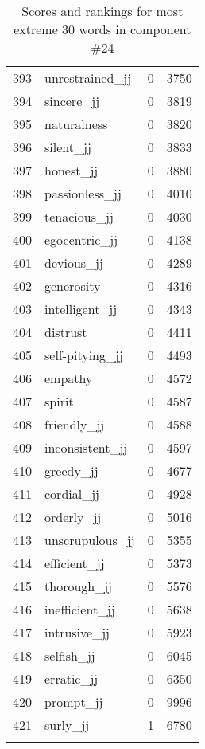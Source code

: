 \begin{longtable}[!htbp]{| rlr@{.}l |}
    393 & unrestrained\_jj & 0 & 3750 \\
    394 & sincere\_jj & 0 & 3819 \\
    395 & naturalness & 0 & 3820 \\
    396 & silent\_jj & 0 & 3833 \\
    397 & honest\_jj & 0 & 3880 \\
    398 & passionless\_jj & 0 & 4010 \\
    399 & tenacious\_jj & 0 & 4030 \\
    400 & egocentric\_jj & 0 & 4138 \\
    401 & devious\_jj & 0 & 4289 \\
    402 & generosity & 0 & 4316 \\
    403 & intelligent\_jj & 0 & 4343 \\
    404 & distrust & 0 & 4411 \\
    405 & self-pitying\_jj & 0 & 4493 \\
    406 & empathy & 0 & 4572 \\
    407 & spirit & 0 & 4587 \\
    408 & friendly\_jj & 0 & 4588 \\
    409 & inconsistent\_jj & 0 & 4597 \\
    410 & greedy\_jj & 0 & 4677 \\
    411 & cordial\_jj & 0 & 4928 \\
    412 & orderly\_jj & 0 & 5016 \\
    413 & unscrupulous\_jj & 0 & 5355 \\
    414 & efficient\_jj & 0 & 5373 \\
    415 & thorough\_jj & 0 & 5576 \\
    416 & inefficient\_jj & 0 & 5638 \\
    417 & intrusive\_jj & 0 & 5923 \\
    418 & selfish\_jj & 0 & 6045 \\
    419 & erratic\_jj & 0 & 6350 \\
    420 & prompt\_jj & 0 & 9996 \\
    421 & surly\_jj & 1 & 6780 \\
    \hline
    \caption{Scores and rankings for most extreme 30 words in component \#24} \\
\end{longtable}
